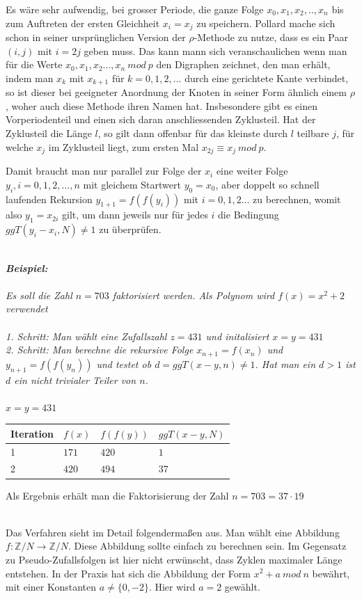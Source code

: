 \documentclass[a4paper,11pt]{article}
\begin{document}
Es wäre sehr aufwendig, bei grosser Periode, die ganze Folge $x_0, x_1, x_2,.., x_n$
bis zum Auftreten der ersten Gleichheit $x_i = x_j$ zu speichern.
Pollard mache sich schon in seiner ursprünglichen
Version der $\rho$-Methode zu nutze, dass es ein Paar $(i,j)$ mit $i=2j$ geben
muss. Das kann mann sich veranschaulichen wenn man für die Werte
$x_0, x_1, x_2..., x_n\ mod\ p$ den Digraphen zeichnet, den man erhält,
indem man $x_k$ mit $x_{k+1}$ für $k=0,1,2,...$ durch eine  gerichtete Kante
verbindet, so ist dieser bei geeigneter Anordnung der Knoten in seiner Form ähnlich
einem $\rho$, woher auch diese Methode ihren Namen hat. Insbesondere gibt es einen
Vorperiodenteil und einen sich daran anschliessenden Zyklusteil. Hat der Zyklusteil die
Länge $l$, so gilt dann offenbar für das kleinste durch $l$ teilbare $j$, für welche
$x_j$ im Zyklusteil liegt, zum ersten Mal $x_{2j} \equiv x_j\ mod\ p$.

Damit braucht man nur parallel zur Folge der $x_i$ eine weiter Folge $y_i,i=0,1,2,..., n$
mit gleichem Startwert $y_0 = x_0$, aber doppelt so schnell laufenden Rekursion
$y_{1+1} = f(f(y_i))$ mit $i=0,1,2...$ zu berechnen, womit also $y_1 = x_{2i}$ gilt,
um dann jeweils nur für jedes $i$ die Bedingung $ggT(y_i-x_i, N) \neq 1$ zu
überprüfen.\\\\
{\it
\textbf{Beispiel:}\\\\
Es soll die Zahl $n=703$ faktorisiert werden. Als Polynom wird $f(x) = x^2 + 2$
verwendet\\\\
1. Schritt: Man wählt eine Zufallszahl $z = 431$ und initalisiert $x = y = 431$\\
2. Schritt: Man berechne die rekursive Folge $x_{n+1} = f(x_n)$ und $y_{n+1} = f(f(y_n))$
 und testet ob $d = ggT(x-y,n) \neq 1$. Hat man ein $d>1$ ist $d$ ein
 nicht trivialer Teiler von $n$.\\\\
$x = y = 431$
\begin{center}
\begin{tabular}{l|l|l|l}
Iteration & $f(x)$ & $f(f(y))$ & $ggT(x-y, N)$\\
\hline
1 & $171$ & $420$ & $1$\\
2 & $420$ & $494$ & $37$\\
\end{tabular}
\end{center}
Als Ergebnis erhält man die Faktorisierung der Zahl $n=703 = 37\cdot 19$\\\\
}
Das Verfahren sieht im Detail folgendermaßen aus. Man wählt
eine Abbildung $f:{\mathbb Z}/N \rightarrow {\mathbb Z}/N$. Diese Abbildung
sollte einfach zu berechnen sein. Im Gegensatz zu Pseudo-Zufallsfolgen ist
hier nicht erwünscht, dass Zyklen maximaler Länge entstehen. In der Praxis
hat sich die Abbildung der Form $x^2+a\ mod\ n$ bewährt, mit einer Konstanten
$a\neq \{0,-2\}$. Hier wird $a = 2$ gewählt.
\end{document}
